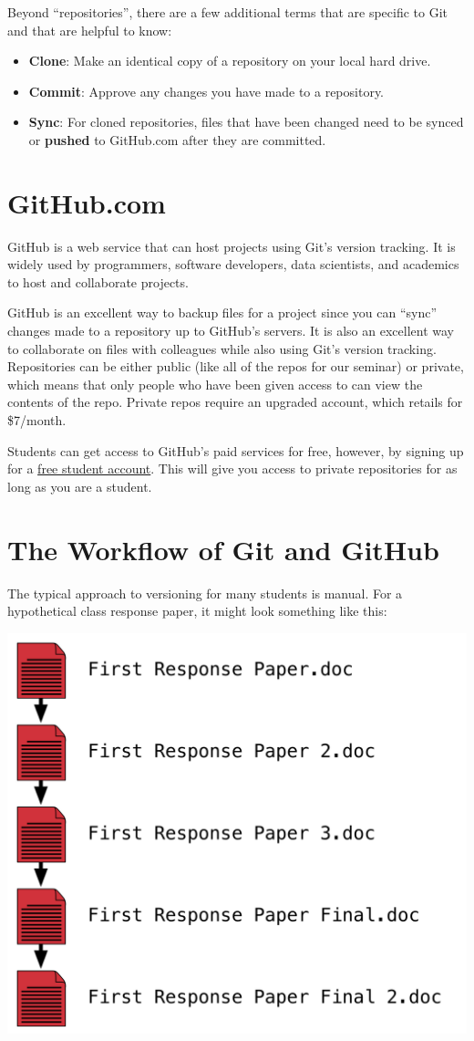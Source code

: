 \documentclass[]{book}
\providecommand{\tightlist}{%
  \setlength{\itemsep}{0pt}\setlength{\parskip}{0pt}}
\theoremstyle{definition}
\theoremstyle{definition}
\theoremstyle{remark}
\begin{document}
Beyond ``repositories'', there are a few additional terms that are
specific to Git and that are helpful to know:

\begin{itemize}
\tightlist
\item
  \textbf{Clone}: Make an identical copy of a repository on your local
  hard drive.
\item
  \textbf{Commit}: Approve any changes you have made to a repository.
\item
  \textbf{Sync}: For cloned repositories, files that have been changed
  need to be synced or \textbf{pushed} to GitHub.com after they are
  committed.
\end{itemize}

\section{GitHub.com}\label{github.com}

GitHub is a web service that can host projects using Git's version
tracking. It is widely used by programmers, software developers, data
scientists, and academics to host and collaborate projects.

GitHub is an excellent way to backup files for a project since you can
``sync'' changes made to a repository up to GitHub's servers. It is also
an excellent way to collaborate on files with colleagues while also
using Git's version tracking. Repositories can be either public (like
all of the repos for our seminar) or private, which means that only
people who have been given access to can view the contents of the repo.
Private repos require an upgraded account, which retails for \$7/month.

Students can get access to GitHub's paid services for free, however, by
signing up for a \href{https://education.github.com}{free student
account}. This will give you access to private repositories for as long
as you are a student.

\section{The Workflow of Git and
GitHub}\label{the-workflow-of-git-and-github}

The typical approach to versioning for many students is manual. For a
hypothetical class response paper, it might look something like this:

\includegraphics[width=0.5\linewidth]{images/gitFlow01}
\end{document}
